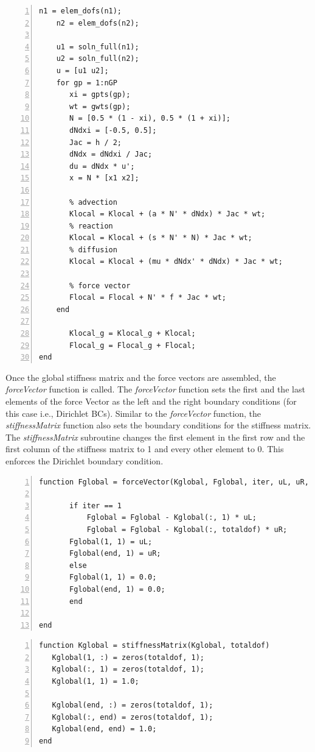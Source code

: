 \documentclass[12pt, oneside]{article}
\begin{document}
\begin{enumerate}
\begin{lstlisting}[frame=single, numbers=left, style=Matlab-editor]
    n1 = elem_dofs(n1);
    n2 = elem_dofs(n2);

    u1 = soln_full(n1);
    u2 = soln_full(n2);
    u = [u1 u2];
    for gp = 1:nGP
	   xi = gpts(gp);
	   wt = gwts(gp);
	   N = [0.5 * (1 - xi), 0.5 * (1 + xi)];
	   dNdxi = [-0.5, 0.5];
	   Jac = h / 2;
	   dNdx = dNdxi / Jac;
	   du = dNdx * u';
	   x = N * [x1 x2];

	   % advection
	   Klocal = Klocal + (a * N' * dNdx) * Jac * wt;
	   % reaction
	   Klocal = Klocal + (s * N' * N) * Jac * wt;
	   % diffusion
	   Klocal = Klocal + (mu * dNdx' * dNdx) * Jac * wt;

	   % force vector
	   Flocal = Flocal + N' * f * Jac * wt;
    end

	   Klocal_g = Klocal_g + Klocal;
	   Flocal_g = Flocal_g + Flocal;
end
       \end{lstlisting}
	   Once the global stiffness matrix and the force vectors are assembled, the \textit{forceVector} function is called. The \textit{forceVector} function sets the first and the last elements of the force Vector as the left and the right boundary conditions (for this case i.e., Dirichlet BCs). Similar to the \textit{forceVector} function, the \textit{stiffnessMatrix} function also sets the boundary conditions for the stiffness matrix. The \textit{stiffnessMatrix} subroutine changes the first element in the first row and the first column of the stiffness matrix to 1 and every other element to 0. This enforces the Dirichlet boundary condition.
	      \begin{lstlisting}[frame=single, numbers=left, style=Matlab-editor]
%% Force vector assembly
function Fglobal = forceVector(Kglobal, Fglobal, iter, uL, uR, totaldof)

       if iter == 1
           Fglobal = Fglobal - Kglobal(:, 1) * uL;
           Fglobal = Fglobal - Kglobal(:, totaldof) * uR;
	   Fglobal(1, 1) = uL;
	   Fglobal(end, 1) = uR;
       else
	   Fglobal(1, 1) = 0.0;
	   Fglobal(end, 1) = 0.0;
       end

end
   \end{lstlisting}
   \begin{lstlisting}[frame=single, numbers=left, style=Matlab-editor]
%% Stiffness Matrix Assembly 
function Kglobal = stiffnessMatrix(Kglobal, totaldof)
   Kglobal(1, :) = zeros(totaldof, 1);
   Kglobal(:, 1) = zeros(totaldof, 1);
   Kglobal(1, 1) = 1.0;

   Kglobal(end, :) = zeros(totaldof, 1);
   Kglobal(:, end) = zeros(totaldof, 1);
   Kglobal(end, end) = 1.0;
end
\end{lstlisting}
\end{enumerate}
\end{document}
